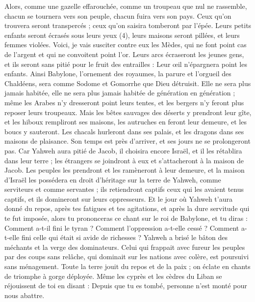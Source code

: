 \begin{multicols}{2}
{Alors, comme une gazelle effarouchée, comme un troupeau que nul ne rassemble, chacun se tournera vers son peuple, chacun fuira vers son pays.
Ceux qu’on trouvera seront transpercés ; ceux qu’on saisira tomberont par l’épée.
Leurs petits enfants seront écrasés sous leurs yeux (4), leurs maisons seront pillées, et leurs femmes violées.
Voici, je vais susciter contre eux les Mèdes, qui ne font point cas de l’argent et qui ne convoitent point l'or.
Leurs arcs écraseront les jeunes gens, et ils seront sans pitié pour le fruit des entrailles : Leur œil n'épargnera point les enfants.
Ainsi Babylone, l’ornement des royaumes, la parure et l'orgueil des Chaldéens, sera comme Sodome et Gomorrhe que Dieu détruisit.
Elle ne sera plus jamais habitée, elle ne sera plus jamais habitée de génération en génération ; même les Arabes n'y dresseront point leurs tentes, et les bergers n'y feront plus reposer leurs troupeaux.
Mais les bêtes sauvages des déserts y prendront leur gîte, et les hiboux rempliront ses maisons, les autruches en feront leur demeure, et les boucs y sauteront.
Les chacals hurleront dans ses palais, et les dragons dans ses maisons de plaisance. Son temps est près d’arriver, et ses jours ne se prolongeront pas.
\VerseOne{}Car Yahweh aura pitié de Jacob, il choisira encore Israël, et il les rétablira dans leur terre ; les étrangers se joindront à eux et s'attacheront à la maison de Jacob.
Les peuples les prendront et les ramèneront à leur demeure, et la maison d'Israël les possédera en droit d'héritage sur la terre de Yahweh, comme serviteurs et comme servantes ; ils retiendront captifs ceux qui les avaient tenus captifs, et ils domineront sur leurs oppresseurs.
Et le jour où Yahweh t’aura donné du repos, après tes fatigues et tes agitations, et après la dure servitude qui te fut imposée,
alors tu prononceras ce chant sur le roi de Babylone, et tu diras : Comment a-t-il fini le tyran ? Comment l’oppression a-t-elle cessé ? Comment a-t-elle fini celle qui était si avide de richesses ?
Yahweh a brisé le bâton des méchants et la verge des dominateurs.
Celui qui frappait avec fureur les peuples par des coups sans relâche, qui dominait sur les nations avec colère, est poursuivi sans ménagement.
Toute la terre jouit du repos et de la paix ; on éclate en chants de triomphe à gorge déployée.
Même les cyprès et les cèdres du Liban se réjouissent de toi en disant : Depuis que tu es tombé, personne n'est monté pour nous abattre.
}
\end{multicols}
